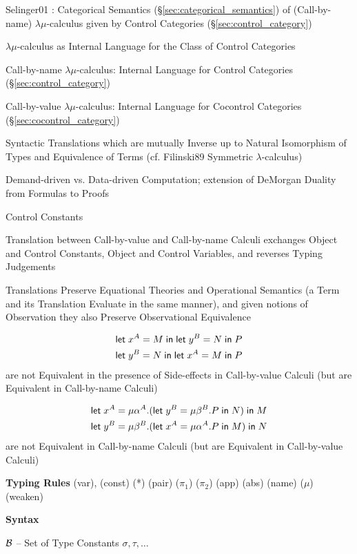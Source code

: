 Selinger01 \cite{selinger01}: Categorical Semantics
(\S\ref{sec:categorical_semantics}) of (Call-by-name)
$\lambda\mu$-calculus given by Control Categories
(\S\ref{sec:control_category})

$\lambda\mu$-calculus as Internal Language for the Class of Control
Categories

Call-by-name $\lambda\mu$-calculus: Internal Language for Control
Categories (\S\ref{sec:control_category})

Call-by-value $\lambda\mu$-calculus: Internal Language for Cocontrol
Categories (\S\ref{sec:cocontrol_category})

Syntactic Translations which are mutually Inverse up to Natural
Isomorphism of Types and Equivalence of Terms (cf. Filinski89
Symmetric $\lambda$-calculus) %

Demand-driven vs. Data-driven Computation; extension of DeMorgan
Duality from Formulas to Proofs %

Control Constants %

Translation between Call-by-value and Call-by-name Calculi exchanges
Object and Control Constants, Object and Control Variables, and
reverses Typing Judgements

Translations Preserve Equational Theories and Operational Semantics (a
Term and its Translation Evaluate in the same manner), and given
notions of Observation they also Preserve Observational Equivalence

\begin{align*}
  & \mathsf{let}\;x^A = M\;\mathsf{in}\;\mathsf{let}\;y^B = N\;\mathsf{in}\;P \\
  & \mathsf{let}\;y^B = N\;\mathsf{in}\;\mathsf{let}\;x^A = M\;\mathsf{in}\;P
\end{align*}
are not Equivalent in the presence of Side-effects in Call-by-value
Calculi (but are Equivalent in Call-by-name Calculi)

\begin{align*}
  & \mathsf{let}\;x^A = \mu\alpha^A.
    (\mathsf{let}\;y^B = \mu\beta^B.P\;\mathsf{in}\;N)\;\mathsf{in}\;M \\
  & \mathsf{let}\;y^B = \mu\beta^B.
    (\mathsf{let}\;x^A = \mu\alpha^A.P\;\mathsf{in}\;M)\;\mathsf{in}\;N
\end{align*}
are not Equivalent in Call-by-name Calculi (but are Equivalent in
Call-by-value Calculi)


\textbf{Typing Rules} (var), (const) (*) (pair) ($\pi_1$) ($\pi_2$)
(app) (abs) (name) ($\mu$) (weaken) %


\textbf{Syntax}

$\mathcal{B}$ -- Set of Type Constants $\sigma,\tau,\ldots$

